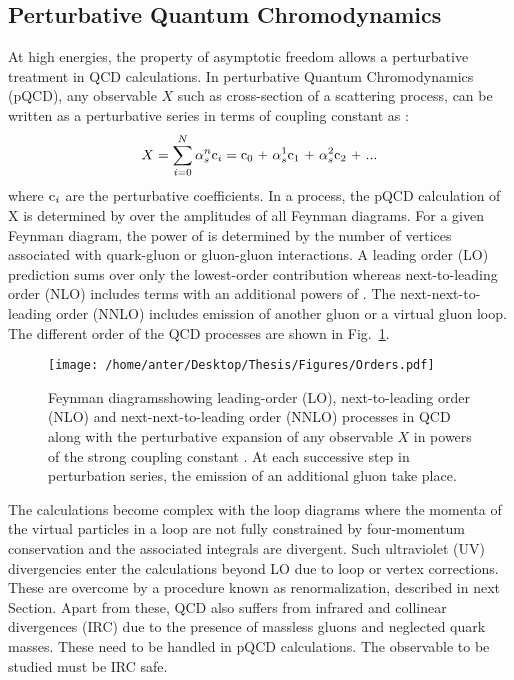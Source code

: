 \subsection{Perturbative Quantum Chromodynamics}
At high energies, the property of asymptotic freedom allows a perturbative treatment in QCD calculations. In perturbative Quantum Chromodynamics (pQCD), any observable $X$ such as cross-section of a scattering process, can be written as a perturbative series in terms of coupling constant \alps as : 
\begin{equation}
X = \sum\limits_{i=0}^{N} \alpha^n_s {\rm c}_i = {\rm c}_0~\plus \alpha^1_s {\rm c}_1~\plus \alpha^2_s {\rm c}_2~\plus ...
\end{equation} 
where ${\rm c}_i$ are the perturbative coefficients. In a process, the pQCD calculation of X is determined by over the amplitudes of all Feynman diagrams. For a given Feynman diagram, the power of \alps is determined by the number of vertices associated with quark-gluon or gluon-gluon interactions. A leading order (LO) prediction sums over only the lowest-order contribution whereas next-to-leading order (NLO) includes terms with an additional powers of \alps. The next-next-to-leading order (NNLO) includes emission of another gluon or a virtual gluon loop. The different order of the QCD processes are shown in Fig.~\ref{fig:orders}.
\begin{figure}[!h]
\begin{center}
\hspace*{-1mm}
\texttt{[image: /home/anter/Desktop/Thesis/Figures/Orders.pdf]}\\
\vspace*{4mm}
\caption[Feynman diagrams showing leading-order (LO), next-to-leading order (NLO) and next-next-to-leading order (NNLO) processes in QCD.]{Feynman diagrams\footnotemark showing leading-order (LO), next-to-leading order (NLO) and next-next-to-leading order (NNLO) processes in QCD along with the perturbative expansion of any observable $X$ in powers of the strong coupling constant \alps. At each successive step in perturbation series, the emission of an additional gluon take place.}
\label{fig:orders}
\end{center}
\end{figure}
The calculations become complex with the loop diagrams where the momenta of the virtual particles in a loop are not fully constrained by four-momentum conservation and the associated integrals are divergent. Such ultraviolet (UV) divergencies enter the calculations beyond LO due to loop or vertex corrections. These are overcome by a procedure known as renormalization, described in next Section. Apart from these, QCD also suffers from infrared and collinear divergences (IRC) due to the presence of massless gluons and neglected quark masses. These need to be handled in pQCD calculations. The observable to be studied must be IRC safe. 

